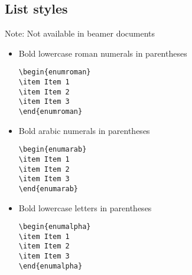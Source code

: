\documentclass{article}
\begin{document}
\newpage
\subsection*{List styles}
Note: Not available in beamer documents\\
\medspace

\begin{itemize}
\item Bold lowercase roman numerals in parentheses
\begin{multicols}{2}
\begin{verbatim}
\begin{enumroman}
\item Item 1
\item Item 2
\item Item 3
\end{enumroman}
\end{verbatim}
\columnbreak
{}
\end{multicols}

\item Bold arabic numerals in parentheses
\begin{multicols}{2}
\begin{verbatim}
\begin{enumarab}
\item Item 1
\item Item 2
\item Item 3
\end{enumarab}
\end{verbatim}
\columnbreak
{}
\end{multicols}

\item Bold lowercase letters in parentheses
\begin{multicols}{2}
\begin{verbatim}
\begin{enumalpha}
\item Item 1
\item Item 2
\item Item 3
\end{enumalpha}
\end{verbatim}
\columnbreak
{}
\end{multicols}
\end{itemize}
\end{document}
